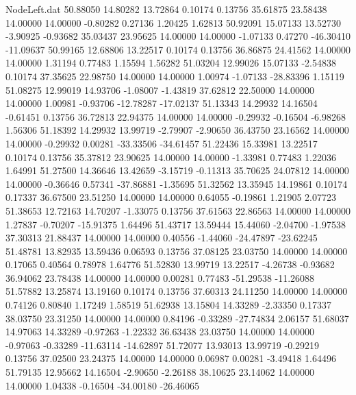 \begin{filecontents}{NodeLeft.dat}
  50.88050   14.80282   13.72864     0.10174    0.13756   35.61875   23.58438   14.00000   14.00000   -0.80282    0.27136    1.20425    1.62813
  50.92091   15.07133   13.52730    -3.90925   -0.93682   35.03437   23.95625   14.00000   14.00000   -1.07133    0.47270  -46.30410  -11.09637
  50.99165   12.68806   13.22517     0.10174    0.13756   36.86875   24.41562   14.00000   14.00000    1.31194    0.77483    1.15594    1.56282
  51.03204   12.99026   15.07133    -2.54838    0.10174   37.35625   22.98750   14.00000   14.00000    1.00974   -1.07133  -28.83396    1.15119
  51.08275   12.99019   14.93706    -1.08007   -1.43819   37.62812   22.50000   14.00000   14.00000    1.00981   -0.93706  -12.78287  -17.02137
  51.13343   14.29932   14.16504    -0.61451    0.13756   36.72813   22.94375   14.00000   14.00000   -0.29932   -0.16504   -6.98268    1.56306
  51.18392   14.29932   13.99719    -2.79907   -2.90650   36.43750   23.16562   14.00000   14.00000   -0.29932    0.00281  -33.33506  -34.61457
  51.22436   15.33981   13.22517     0.10174    0.13756   35.37812   23.90625   14.00000   14.00000   -1.33981    0.77483    1.22036    1.64991
  51.27500   14.36646   13.42659    -3.15719   -0.11313   35.70625   24.07812   14.00000   14.00000   -0.36646    0.57341  -37.86881   -1.35695
  51.32562   13.35945   14.19861     0.10174    0.17337   36.67500   23.51250   14.00000   14.00000    0.64055   -0.19861    1.21905    2.07723
  51.38653   12.72163   14.70207    -1.33075    0.13756   37.61563   22.86563   14.00000   14.00000    1.27837   -0.70207  -15.91375    1.64496
  51.43717   13.59444   15.44060    -2.04700   -1.97538   37.30313   21.88437   14.00000   14.00000    0.40556   -1.44060  -24.47897  -23.62245
  51.48781   13.82935   13.59436     0.06593    0.13756   37.08125   23.03750   14.00000   14.00000    0.17065    0.40564    0.78978    1.64776
  51.52830   13.99719   13.22517    -4.26738   -0.93682   36.94062   23.78438   14.00000   14.00000    0.00281    0.77483  -51.29538  -11.26088
  51.57882   13.25874   13.19160     0.10174    0.13756   37.60313   24.11250   14.00000   14.00000    0.74126    0.80840    1.17249    1.58519
  51.62938   13.15804   14.33289    -2.33350    0.17337   38.03750   23.31250   14.00000   14.00000    0.84196   -0.33289  -27.74834    2.06157
  51.68037   14.97063   14.33289    -0.97263   -1.22332   36.63438   23.03750   14.00000   14.00000   -0.97063   -0.33289  -11.63114  -14.62897
  51.72077   13.93013   13.99719    -0.29219    0.13756   37.02500   23.24375   14.00000   14.00000    0.06987    0.00281   -3.49418    1.64496
  51.79135   12.95662   14.16504    -2.90650   -2.26188   38.10625   23.14062   14.00000   14.00000    1.04338   -0.16504  -34.00180  -26.46065

\end{filecontents}
